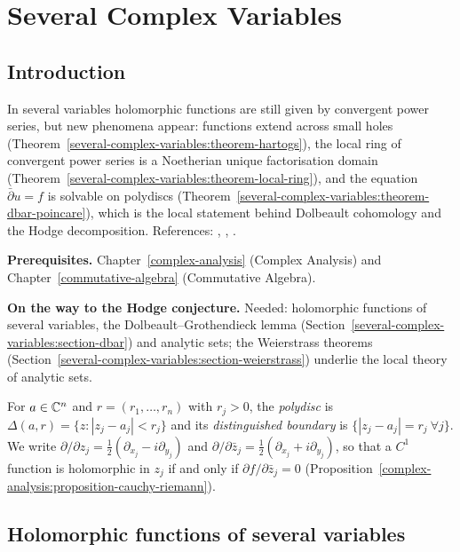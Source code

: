 \chapter{Several Complex Variables}\label{several-complex-variables}

\section{Introduction}\label{several-complex-variables:section-introduction}

In several variables holomorphic functions are still given by convergent power series, but new phenomena appear: functions extend
across small holes (Theorem~\ref{several-complex-variables:theorem-hartogs}), the local ring of convergent power series is a
Noetherian unique factorisation domain (Theorem~\ref{several-complex-variables:theorem-local-ring}), and the equation
$\bar\partial u = f$ is solvable on polydiscs (Theorem~\ref{several-complex-variables:theorem-dbar-poincare}), which is the local
statement behind Dolbeault cohomology and the Hodge decomposition. References: \cite{hormander-scv}, \cite{gunning-rossi},
\cite[Chapter 0]{griffiths-harris}.

\noindent\textbf{Prerequisites.} Chapter~\ref{complex-analysis} (Complex Analysis) and Chapter~\ref{commutative-algebra} (Commutative Algebra).

\noindent\textbf{On the way to the Hodge conjecture.} Needed: holomorphic functions of several variables, the Dolbeault--Grothendieck lemma (Section~\ref{several-complex-variables:section-dbar}) and analytic sets; the Weierstrass
theorems (Section~\ref{several-complex-variables:section-weierstrass}) underlie the local theory of analytic sets.

For $a \in \mathbb{C}^n$ and $r = (r_1, \ldots, r_n)$ with $r_j > 0$, the \emph{polydisc} is $\Delta(a, r) = \{z : |z_j - a_j| < r_j\}$ and its
\emph{distinguished boundary} is $\{|z_j - a_j| = r_j \ \forall j\}$. We write $\partial/\partial z_j = \frac12(\partial_{x_j} - i\partial_{y_j})$ and
$\partial/\partial\bar z_j = \frac12(\partial_{x_j} + i\partial_{y_j})$, so that a $C^1$ function is holomorphic in $z_j$ if and only if
$\partial f/\partial\bar z_j = 0$ (Proposition~\ref{complex-analysis:proposition-cauchy-riemann}).

\section{Holomorphic functions of several variables}\label{several-complex-variables:section-holomorphic}

